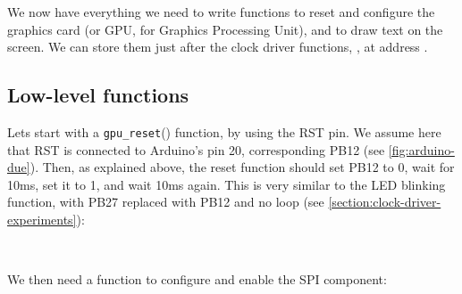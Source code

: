
We now have everything we need to write functions to reset and configure the
graphics card (or GPU, for Graphics Processing Unit), and to draw text on the
screen. We can store them just after the clock driver functions, \ie, at
address .

\subsection{Low-level functions}

Lets start with a \verb!gpu_reset!() function, by using the RST pin. We assume
here that RST is connected to Arduino's pin 20, corresponding PB12 (see
\cref{fig:arduino-due}). Then, as explained above, the reset function should
set PB12 to 0, wait for 10ms, set it to 1, and wait 10ms again. This is very
similar to the LED blinking function, with PB27 replaced with PB12 and no loop
(see \cref{section:clock-driver-experiments}):

\begin{TwoColumns}
\\
\end{TwoColumns}

We then need a function to configure and enable the SPI component:

